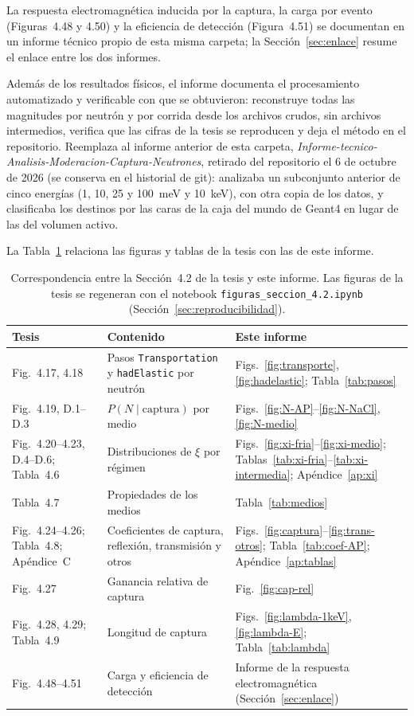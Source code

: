 \documentclass[11pt,a4paper]{article}
\newcommand{\var}[1]{\texttt{#1}}
\begin{document}
La respuesta electromagnética inducida por la captura, la carga por evento (Figuras~4.48 y 4.50) y la eficiencia de detección (Figura~4.51) se documentan en un informe técnico propio de esta misma carpeta; la Sección~\ref{sec:enlace} resume el enlace entre los dos informes.

Además de los resultados físicos, el informe documenta el procesamiento automatizado y verificable con que se obtuvieron: reconstruye todas las magnitudes por neutrón y por corrida desde los archivos crudos, sin archivos intermedios, verifica que las cifras de la tesis se reproducen y deja el método en el repositorio. Reemplaza al informe anterior de esta carpeta, \textit{Informe-tecnico-Analisis-Moderacion-Captura-Neutrones}, retirado del repositorio el 6 de octubre de 2026 (se conserva en el historial de git): analizaba un subconjunto anterior de cinco energías (1, 10, 25 y 100~meV y 10~keV), con otra copia de los datos, y clasificaba los destinos por las caras de la caja del mundo de Geant4 en lugar de las del volumen activo.

La Tabla~\ref{tab:correspondencia} relaciona las figuras y tablas de la tesis con las de este informe.

\begin{table}[H]
\centering
\small
\caption{Correspondencia entre la Sección~4.2 de la tesis y este informe. Las figuras de la tesis se regeneran con el notebook \texttt{figuras\_seccion\_4.2.ipynb} (Sección~\ref{sec:reproducibilidad}).}
\label{tab:correspondencia}
\begin{tabularx}{\linewidth}{@{}>{\raggedright\arraybackslash}p{3.3cm}>{\raggedright\arraybackslash}X>{\raggedright\arraybackslash}p{5.0cm}@{}}
\toprule
\textbf{Tesis} & \textbf{Contenido} & \textbf{Este informe} \\
\midrule
Fig.~4.17, 4.18 & Pasos \var{Transportation} y \var{hadElastic} por neutrón & Figs.~\ref{fig:transporte}, \ref{fig:hadelastic}; Tabla~\ref{tab:pasos} \\
Fig.~4.19, D.1--D.3 & $P(N\mid\text{captura})$ por medio & Figs.~\ref{fig:N-AP}--\ref{fig:N-NaCl}, \ref{fig:N-medio} \\
Fig.~4.20--4.23, D.4--D.6; Tabla~4.6 & Distribuciones de $\xi$ por régimen & Figs.~\ref{fig:xi-fria}--\ref{fig:xi-medio}; Tablas~\ref{tab:xi-fria}--\ref{tab:xi-intermedia}; Apéndice~\ref{ap:xi} \\
Tabla~4.7 & Propiedades de los medios & Tabla~\ref{tab:medios} \\
Fig.~4.24--4.26; Tabla~4.8; Apéndice~C & Coeficientes de captura, reflexión, transmisión y otros & Figs.~\ref{fig:captura}--\ref{fig:trans-otros}; Tabla~\ref{tab:coef-AP}; Apéndice~\ref{ap:tablas} \\
Fig.~4.27 & Ganancia relativa de captura & Fig.~\ref{fig:cap-rel} \\
Fig.~4.28, 4.29; Tabla~4.9 & Longitud de captura & Figs.~\ref{fig:lambda-1keV}, \ref{fig:lambda-E}; Tabla~\ref{tab:lambda} \\
Fig.~4.48--4.51 & Carga y eficiencia de detección & Informe de la respuesta electromagnética (Sección~\ref{sec:enlace}) \\
\bottomrule
\end{tabularx}
\end{table}
\end{document}

